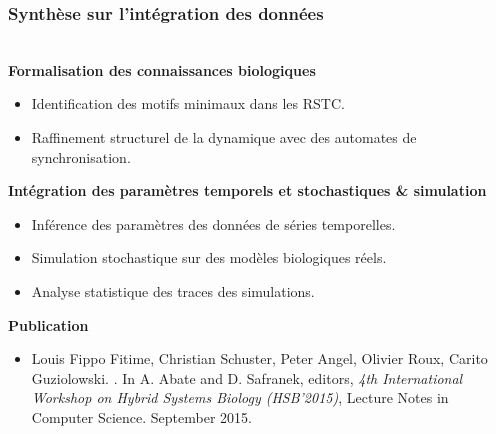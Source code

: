 \begin{frame}[c]
  \frametitle{Synthèse sur l'intégration des données}


{}\\
\medskip
\textbf{Formalisation des connaissances biologiques}
  \begin{itemize}
   \item Identification des motifs minimaux dans les RSTC. 
   \item Raffinement structurel de la dynamique avec des automates de synchronisation.
  \end{itemize}
\medskip
\textbf{Intégration des paramètres temporels et stochastiques \& simulation}
\begin{itemize}
 \item Inférence des paramètres des données de séries temporelles.
 \item Simulation stochastique sur des modèles biologiques réels.
 \item Analyse statistique des traces des simulations.
\end{itemize}
\medskip
\textbf{Publication}
\begin{itemize}
 \footnotesize
 \item
Louis Fippo Fitime, Christian Schuster, Peter Angel, Olivier Roux, Carito Guziolowski. . In A. Abate and D. Safranek, editors, \textit{4th International Workshop on Hybrid Systems
Biology (HSB'2015)}, Lecture Notes in Computer Science. September 2015.

\end{itemize}

\end{frame}
